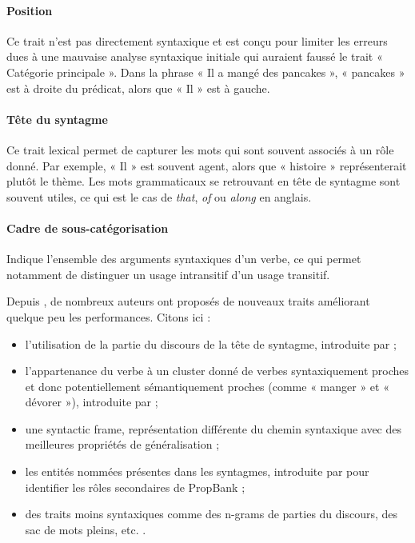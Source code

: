 \paragraph{Position} Ce trait n'est pas directement syntaxique et est conçu pour limiter les erreurs dues à une mauvaise analyse syntaxique initiale qui auraient faussé le trait « Catégorie principale ». Dans la phrase « Il a mangé des pancakes », « pancakes » est à droite du prédicat, alors que « Il » est à gauche.

\paragraph{Tête du syntagme} Ce trait lexical permet de capturer les mots qui sont souvent associés à un rôle donné. Par exemple, « Il » est souvent agent, alors que « histoire » représenterait plutôt le thème. Les mots grammaticaux se retrouvant en tête de syntagme sont souvent utiles, ce qui est le cas de \textit{that}, \textit{of} ou \textit{along} en anglais.

\paragraph{Cadre de sous-catégorisation} Indique l'ensemble des arguments syntaxiques d'un verbe, ce qui permet notamment de distinguer un usage intransitif d'un usage transitif.

Depuis \cite{gildea2002automatic}, de nombreux auteurs ont proposés de nouveaux traits améliorant quelque peu les performances. Citons ici :
\begin{itemize}
    \item l'utilisation de la partie du discours de la tête de syntagme, introduite par \cite{surdeanu2003using} ;
    \item l'appartenance du verbe à un cluster donné de verbes syntaxiquement proches et donc potentiellement sémantiquement proches (comme « manger » et « dévorer »), introduite par \cite{pradhan2004shallow} ;
    \item une {syntactic frame}, représentation différente du chemin syntaxique avec des meilleures propriétés de généralisation \citep{xue2004calibrating} ;
    \item les entités nommées présentes dans les syntagmes, introduite par \cite{pradhan2005semantic} pour identifier les rôles secondaires de PropBank ;
    \item des traits moins syntaxiques comme des n-grams de parties du discours, des sac de mots pleins, etc. \citep{surdeanu2007combination}.
\end{itemize}

